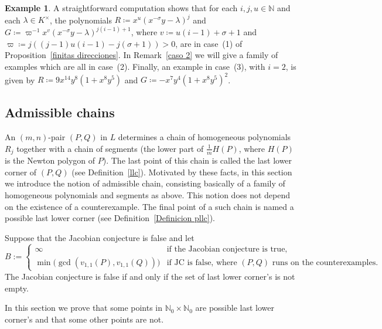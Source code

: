 \documentclass[reqno,a4paper]{amsart}
\theoremstyle{definition}
\newtheorem{example}[theorem]{Example}
\theoremstyle{remark}
\begin{document}
\begin{example}
A straightforward computation shows that for each $i,j,u\in \mathds{N}$ and each $\lambda\in K^{\times}$, the polynomials $R\coloneqq  x^u(x^{-\sigma}y -\lambda)^j$ and $G\coloneqq \varpi^{-1} x^v(x^{-\sigma}y - \lambda)^{j(i-1)+1}$, where $v\coloneqq u(i-1)+\sigma+1$ and $\varpi\coloneqq j((j-1)u(i-1) - j(\sigma+1))>0$, are in case~(1) of Proposition~\ref{finitas direcciones}. In Remark~\ref{caso 2} we will give a family of examples which are all in case~(2). Finally, an example in case~(3), with $i=2$, is given by $R\coloneqq 9 x^{14} y^8 (1 + x^8 y^5)$ and $G\coloneqq -x^7 y^4 (1 + x^8 y^5)^2$.
\end{example}

\subsection{Admissible chains}
%
An $(m,n)$-pair $(P,Q)$ in $L$ determines a chain of homogeneous polynomials $R_j$ together with a chain of segments (the lower part of $\frac{1}{m}H(P)$, where $H(P)$ is the Newton polygon of $P$). The last point of this chain is called the last lower corner of $(P,Q)$ (see Definition~\ref{llc}). Motivated by these facts, in this section we introduce the notion of admissible chain, consisting basically of a family of homogeneous polynomials and segments as above. This notion does not depend on the existence of a counterexample.  The final point of a such chain is named a possible last lower corner (see Definition~\ref{Definicion pllc}).

Suppose that the Jacobian conjecture is false and let
$$
B := \begin{cases}\infty & \text{if the Jacobian conjecture is true,}\\
%
\min\bigl(\gcd(v_{1,1}(P),v_{1,1}(Q))\bigr)&\text{if JC is false, where $(P,Q)$ runs on the counterexamples.}
\end{cases}
$$
The Jacobian conjecture is false if and only if the set of last lower corner's is not empty.

\smallskip

In this section we prove that some points in $\mathds{N}_0\times \mathds{N}_0$ are possible last lower corner's and that some other points are not.
\end{document}
